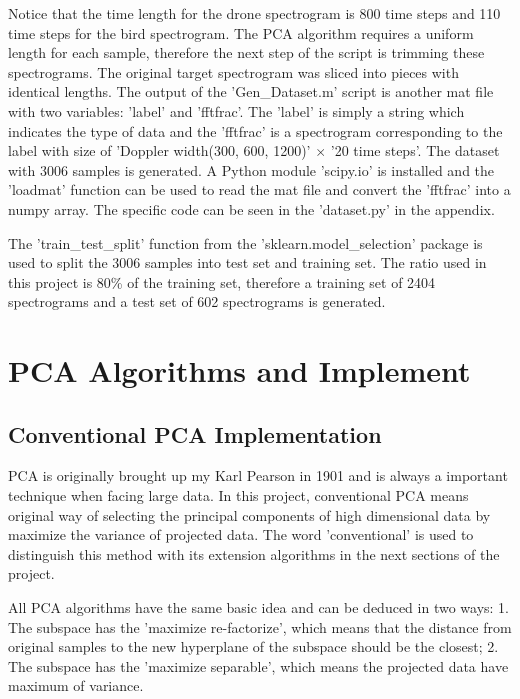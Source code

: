 \documentclass{cta-author}
\begin{document}
Notice that the time length for the drone spectrogram is 800 time steps and 110 time steps for the bird spectrogram. The PCA algorithm requires a uniform length for each sample, therefore the next step of the script is trimming these spectrograms. The original target spectrogram was sliced into pieces with identical lengths.
The output of the 'Gen\_Dataset.m' script is another mat file with two variables: 'label' and 'fftfrac'. The 'label' is simply a string which indicates the type of data and the 'fftfrac' is a spectrogram corresponding to the label with size of 'Doppler width(300, 600, 1200)' $\times$ '20 time steps'.
The dataset with 3006 samples is generated. A Python module 'scipy.io' is installed and the 'loadmat' function can be used to read the mat file and convert the 'fftfrac' into a numpy array. The specific code can be seen in the 'dataset.py' in the appendix.

The 'train\_test\_split' function from the 'sklearn.model\_selection' package is used to split the 3006 samples into test set and training set. The ratio used in this project is 80\% of the training set, therefore a training set of 2404 spectrograms and a test set of 602 spectrograms is generated.
\section{PCA Algorithms and Implement}
\subsection{Conventional PCA Implementation}
PCA is originally brought up my Karl Pearson in 1901 and is always a important technique when facing large data.
In this project, conventional PCA means original way of selecting the principal components of high dimensional data by maximize the variance of projected data.
The word 'conventional' is used to distinguish this method with its extension algorithms in the next sections of the project.

All PCA algorithms have the same basic idea and can be deduced in two ways: 1. The subspace has the 'maximize re-factorize', which means that the distance from original samples to the new hyperplane of the subspace should be the closest; 2. The subspace has the 'maximize separable', which means the projected data have maximum of variance.
\end{document}
